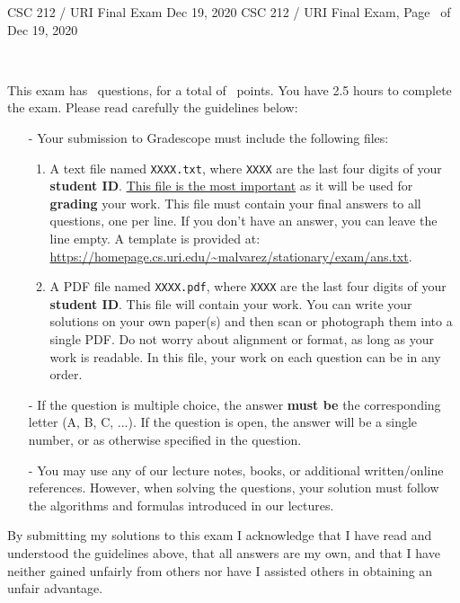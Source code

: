 \usepackage{graphicx}
\usepackage{amsmath}
\usepackage{amssymb}
\usepackage{hyperref}

\linespread{1.25}
\extrawidth{.75in}
\setlength\linefillheight{.5in}

\pagestyle{headandfoot}

\runningheadrule
\firstpageheader
    {CSC 212 / URI}
    {Final Exam}
    {Dec 19, 2020}
\runningheader
    {CSC 212 / URI}
    {Final Exam, Page \thepage\ of \numpages}
    {Dec 19, 2020}
\firstpagefooter
    {}
    {}
    {}
\runningfooter
    {}
    {}
    {}



~{\large
    \vspace{.5in}

    This exam has \numquestions\ questions, for a total of \numpoints\ points.  You have 2.5 hours to complete the exam.  Please read carefully the guidelines below:

    \begin{itemize}
        \item[-] Your submission to Gradescope must include the following files:
        \begin{enumerate}
            \item A text file named \verb|XXXX.txt|, where \verb|XXXX| are the last four digits of your {\bf student ID}.  \underline{This file is the most important} as it will be used for {\bf grading} your work.  This file must contain your final answers to all questions, one per line.  If you don't have an answer, you can leave the line empty.  A template is provided at: \url{https://homepage.cs.uri.edu/~malvarez/stationary/exam/ans.txt}.
            \item A PDF file named \verb|XXXX.pdf|, where \verb|XXXX| are the last four digits of your {\bf student ID}.  This file will contain your work.  You can write your solutions on your own paper(s) and then scan or photograph them into a single PDF.  Do not worry about alignment or format, as long as your work is readable. In this file, your work on each question can be in any order.
        \end{enumerate}
        \item[-] If the question is multiple choice, the answer {\bf must be} the corresponding letter (A, B, C, ...).  If the question is open, the answer will be a single number, or as otherwise specified in the question.
        \item[-] You may use any of our lecture notes, books, or additional written/online references.  However, when solving the questions, your solution must follow the algorithms and formulas introduced in our lectures.
    \end{itemize}
    
    By submitting my solutions to this exam I acknowledge that I have read and understood the guidelines above, that all answers are my own, and that I have neither gained unfairly from others nor have I assisted others in obtaining an unfair advantage.
}
